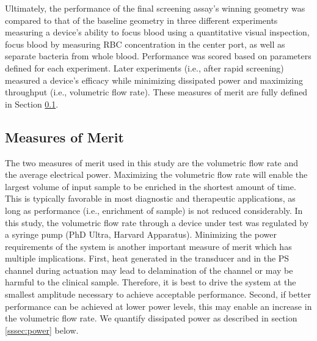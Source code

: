 Ultimately, the performance of the final screening assay's winning geometry was compared to that of the baseline geometry in three different experiments measuring a device's ability to focus blood using a quantitative visual inspection, focus blood by measuring RBC concentration in the center port, as well as separate bacteria from whole blood. Performance was scored based on parameters defined for each experiment. Later experiments (i.e., after rapid screening) measured a device's efficacy while minimizing dissipated power and maximizing throughput (i.e., volumetric flow rate). These measures of merit are fully defined in Section \ref{ssec:MoM}.

\subsection{Measures of Merit}
\label{ssec:MoM}



The two measures of merit used in this study are the volumetric flow rate and the average electrical power. Maximizing the volumetric flow rate will enable the largest volume of input sample to be enriched in the shortest amount of time. This is typically favorable in most diagnostic and therapeutic applications, as long as performance (i.e., enrichment of sample) is not reduced considerably. In this study, the volumetric flow rate through a device under test was regulated by a syringe pump (PhD Ultra, Harvard Apparatus). Minimizing the power requirements of the system is another important measure of merit which has multiple implications. First, heat generated in the transducer and in the PS channel during actuation may lead to delamination of the channel or may be harmful to the clinical sample. Therefore, it is best to drive the system at the smallest amplitude necessary to achieve acceptable performance. Second, if better performance can be achieved at lower power levels, this may enable an increase in the volumetric flow rate. We quantify dissipated power as described in section \ref{sssec:power} below.

